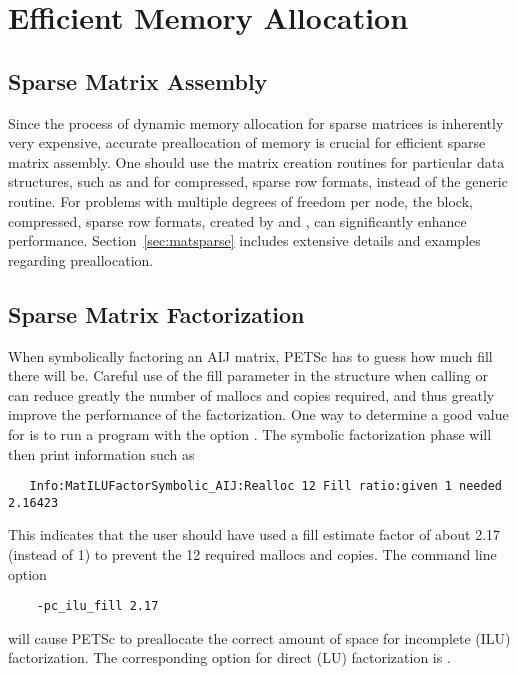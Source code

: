 \section{Efficient Memory Allocation}
\label{sec:perf:memory}

\subsection{Sparse Matrix Assembly}

Since the process of dynamic memory allocation for sparse matrices is
inherently very expensive, accurate preallocation of memory is crucial
for efficient sparse matrix assembly.  One should use the matrix creation
routines for particular data structures, such as  and  for compressed, sparse
row formats, instead of the generic  routine.  For
problems with multiple degrees of freedom per node, the block,
compressed, sparse row formats, created by 
and , can significantly enhance performance.
Section~\ref{sec:matsparse} includes extensive details and
examples regarding preallocation.

\subsection{Sparse Matrix Factorization}
\label{sec:symbolfactor}

When symbolically factoring an AIJ matrix, PETSc has to guess
how much fill there will be.  Careful use of the fill parameter in the 
 structure  
when calling  or 
can reduce greatly the number of mallocs and copies required, and thus
greatly improve the performance of the factorization.  One way to
determine a good value for  is to run a program with the option .
The symbolic factorization phase will then print information such as
\begin{verbatim}
   Info:MatILUFactorSymbolic_AIJ:Realloc 12 Fill ratio:given 1 needed 2.16423
\end{verbatim}
This indicates that the user should have used a fill estimate factor of
about 2.17 (instead of 1) to prevent the 12 required mallocs and copies.
The command line option   
\begin{verbatim}
    -pc_ilu_fill 2.17
\end{verbatim}
will cause PETSc to preallocate the correct amount of space for incomplete
(ILU) factorization.  The corresponding option for direct (LU) factorization
is  .

